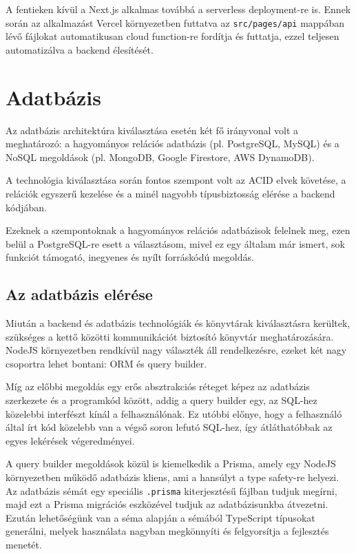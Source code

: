A fentieken kívül a Next.js alkalmas továbbá a serverless deployment-re is. Ennek során az alkalmazást Vercel környezetben futtatva az \lstinline|src/pages/api| mappában lévő fájlokat
automatikusan cloud function-re fordítja és futtatja, ezzel teljesen automatizálva a backend élesítését. \cite{NextJS}

\section{Adatbázis}
Az adatbázis architektúra kiválasztása esetén két fő irányvonal volt a meghatározó: a hagyományos relációs adatbázis (pl. PostgreSQL, MySQL) és a NoSQL megoldások (pl. MongoDB, Google Firestore, AWS DynamoDB).

A technológia kiválasztása során fontos szempont volt az ACID elvek követése, a relációk egyszerű kezelése és a minél nagyobb típusbiztosság elérése a backend kódjában.

Ezeknek a szempontoknak a hagyományos relációs adatbázisok felelnek meg, ezen belül a PostgreSQL-re esett a választásom, mivel ez egy általam már ismert, sok funkciót támogató, inegyenes és nyílt forráskódú megoldás. \cite{Postgresql}

\subsection{Az adatbázis elérése}
Miután a backend és adatbázis technológiák és könyvtárak kiválasztásra kerültek, szükséges a kettő közötti kommunikációt biztosító könyvtár meghatározására.
NodeJS környezetben rendkívül nagy választék áll rendelkezésre, ezeket két nagy csoportra lehet bontani: ORM és query builder.

Míg az előbbi megoldás egy erős absztrakciós réteget képez az adatbázis szerkezete és a programkód között, addig a query builder egy, az SQL-hez közelebbi interfészt kínál a felhasználónak.
Ez utóbbi előnye, hogy a felhasználó által írt kód közelebb van a végső soron lefutó SQL-hez, így átláthatóbbak az egyes lekérések végeredményei.

A query builder megoldások közül is kiemelkedik a Prisma, amely egy NodeJS környezetben működő adatbázis kliens, ami a hansúlyt a type safety-re helyezi.
Az adatbázis sémát egy speciális \lstinline|.prisma| kiterjesztésű fájlban tudjuk megírni, majd ezt a Prisma migrációs eszközével tudjuk az adatbázisunkba átvezetni.
Ezután lehetőségünk van a séma alapján a sémából TypeScript típusokat generálni, melyek használata nagyban megkönnyíti és felgyorsítja a fejlesztés menetét.

